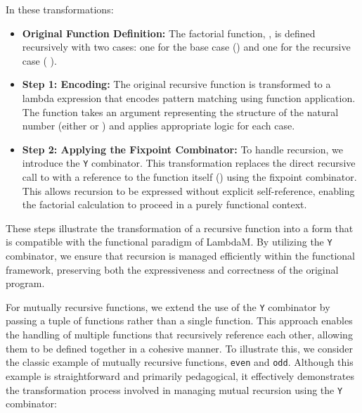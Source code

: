\documentclass{IEEEtran}
\begin{document}
\par In these transformations:
\begin{itemize}
    \item \textbf{Original Function Definition:} The factorial function, , is defined recursively with two cases: one for the base case () and one for the recursive case ( ).
    \item \textbf{Step 1: Encoding:} The original recursive function is transformed to a lambda expression that encodes pattern matching using function application. The function  takes an argument  representing the structure of the natural number (either  or  ) and applies appropriate logic for each case.
    \item \textbf{Step 2: Applying the Fixpoint Combinator:} To handle recursion, we introduce the \texttt{Y} combinator. This transformation replaces the direct recursive call to  with a reference to the function itself () using the fixpoint combinator. This allows recursion to be expressed without explicit self-reference, enabling the factorial calculation to proceed in a purely functional context.
\end{itemize}

\par These steps illustrate the transformation of a recursive function into a form that is compatible with the functional paradigm of LambdaM. By utilizing the \texttt{Y} combinator, we ensure that recursion is managed efficiently within the functional framework, preserving both the expressiveness and correctness of the original program.

\par For mutually recursive functions, we extend the use of the \texttt{Y} combinator by passing a tuple of functions rather than a single function. This approach enables the handling of multiple functions that recursively reference each other, allowing them to be defined together in a cohesive manner. To illustrate this, we consider the classic example of mutually recursive functions, \texttt{even} and \texttt{odd}. Although this example is straightforward and primarily pedagogical, it effectively demonstrates the transformation process involved in managing mutual recursion using the \texttt{Y} combinator:
\end{document}
